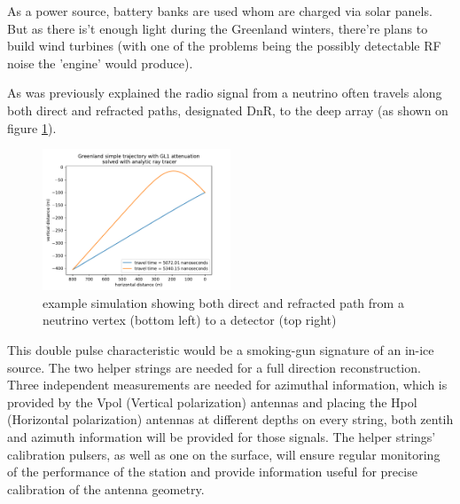 \documentclass[11pt,a4paper,faculty=we,language=en,doctype=report]{cls/ugent-doc}
\begin{document}
As a power source, battery banks are used whom are charged via solar panels.
But as there is't enough light during the Greenland winters, there're plans to
build wind turbines (with one of the problems being the possibly detectable RF
noise the 'engine' would produce).

As was previously explained the radio signal from a neutrino often travels
along both direct and refracted paths, designated DnR, to the deep array (as shown
on figure \ref{fig:DnR}).
\begin{figure}
  \centering
  \includegraphics[width=0.5\textwidth]{DnR.pdf}
  \caption{example simulation showing both direct and refracted path from a neutrino vertex (bottom left) to a detector (top right)}
  \label{fig:DnR}
\end{figure}
This double pulse characteristic would be a smoking-gun signature of an in-ice
source. The two helper strings are needed for a full direction reconstruction.
Three independent measurements are needed for azimuthal information, which is
provided by the Vpol (Vertical polarization) antennas and placing the Hpol
(Horizontal polarization) antennas at different depths on every string, both
zentih and azimuth information will be provided for those signals. The helper
strings' calibration pulsers, as well as one on the surface, will ensure
regular monitoring of the performance of the station and provide information
useful for precise calibration of the antenna geometry.
\end{document}
